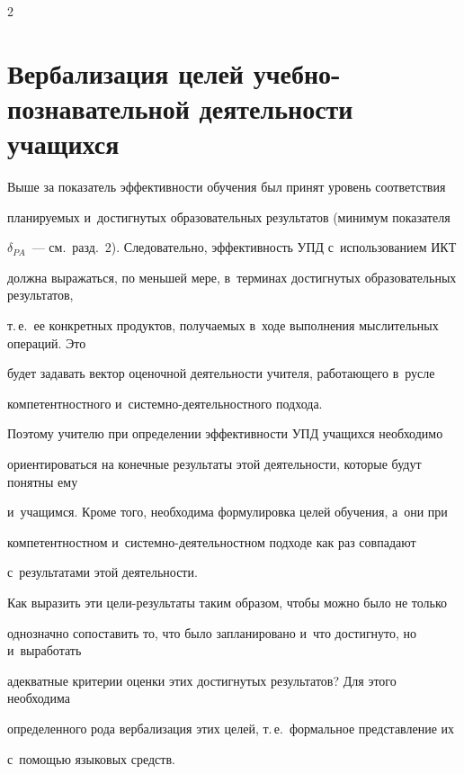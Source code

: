 \begin{multicols}{2}
\vspace*{-6pt}





\section{Вербализация целей учебно-познавательной деятельности учащихся}





  Выше  за показатель эф\-фек\-тив\-ности обучения был принят уровень соответствия


планируемых и~достигнутых образовательных результатов (минимум показателя


$\delta_{PA}$~--- см.\ разд.~2). Следовательно, эффективность УПД с~использованием ИКТ


должна выражаться, по меньшей мере, в~терминах достигнутых образовательных результатов,


т.\,е.\ ее конкретных продуктов, получаемых в~ходе выполнения мыслительных операций. Это


будет задавать вектор оценочной деятельности учителя, ра\-бо\-та\-юще\-го в~русле


компетентностного и~сис\-тем\-но-де\-я\-тель\-ност\-но\-го подхода.


%


  Поэтому учителю при определе\-нии эффективности УПД учащихся необходимо


ориентироваться на конечные результаты этой деятельности, которые будут понятны ему


и~учащимся. Кроме того, необходима формулировка целей обучения, а~они при


компетентностном и~сис\-тем\-но-де\-я\-тель\-ност\-ном подходе как раз совпадают


с~результатами этой деятельности.





  Как выразить эти цели-результаты таким образом, чтобы можно было не только


однозначно сопоставить то, что было запланировано и~что достигнуто, но и~выработать


адекватные критерии оценки этих достигнутых результатов? Для этого необходима


определенного рода вербализация этих целей, т.\,е.\ формальное представление их


с~по\-мощью языковых средств.






\end{multicols}
